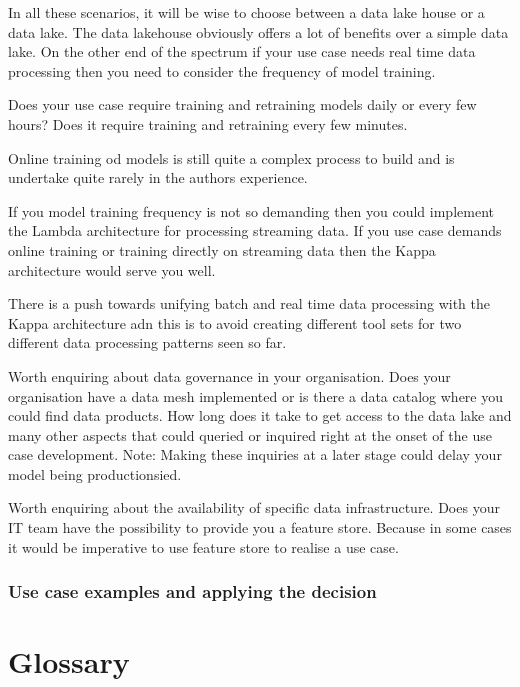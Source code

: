 \documentclass[a4paper, 11pt]{article}
\begin{document}
    In all these scenarios, it will be wise to choose between a data lake house or a data lake.
    The data lakehouse obviously offers a lot of benefits over a simple data lake.
    On the other end of the spectrum if your use case needs real time data processing then you need to consider the frequency of model training.

    Does your use case require training and retraining models daily or every few hours?
    Does it require training and retraining every few minutes.

    Online training od models is still quite a complex process to build and is undertake quite rarely in the authors experience.

    If you model training frequency is not so demanding then you could implement the Lambda architecture for processing streaming data.
    If you use case demands online training or training directly on streaming data then the Kappa architecture would serve you well.

    There is a push towards unifying batch and real time data processing with the Kappa architecture adn this is to avoid creating different tool sets for two different data processing patterns seen so far.

    Worth enquiring about data governance in your organisation.
    Does your organisation have a data mesh implemented or is there a data catalog where you could find data products.
    How long does it take to get access to the data lake and many other aspects that could queried or inquired right at the onset of the use case development.
    Note: Making these inquiries at a later stage could delay your model being productionsied.

    Worth enquiring about the availability of specific data infrastructure.
    Does your IT team have the possibility to provide you a feature store.
    Because in some cases it would be imperative to use feature store to realise a use case.

    \subsection{Use case examples and applying the decision}


    \chapter{Glossary}
\end{document}
